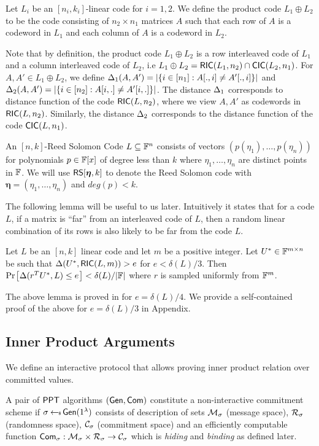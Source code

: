 \begin{definition}\label{defn:productcode}
Let $L_i$ be an $[n_i,k_i]$-linear code for $i=1,2$. We define the product code
$L_1\oplus L_2$ to be the code consisting of $n_2\times n_1$ matrices $A$ such
that each row of $A$ is a codeword in $L_1$ and each column of $A$ is a
codeword in $L_2$. 
\end{definition}

Note that by definition, the product code $L_1\oplus L_2$ is a row interleaved
code of $L_1$ and a column interleaved code of $L_2$, i.e $L_1\oplus L_2 =
\mathsf{RIC}(L_1,n_2)\cap \mathsf{CIC}(L_2,n_1)$. For $A,A'\in L_1\oplus L_2$, we define
$\Delta_1(A,A')=|\{i\in [n_1]: A[.,i]\neq A'[.,i]\}|$ and $\Delta_2(A,A')=|\{i\in
[n_2]: A[i,.]\neq A'[i,.]\}|$. The distance $\Delta_1$ corresponds to distance
function of the code $\mathsf{RIC}(L,n_2)$, where we view $A,A'$ as codewords in
$\mathsf{RIC}(L,n_2)$. Similarly, the distance $\Delta_2$ corresponds to the distance
function of the code $\mathsf{CIC}(L,n_1)$.

\begin{definition}\label{defn:rscode}
An $[n,k]$-Reed Solomon Code $L\subseteq \mathbb{F}^n$ consists of vectors
$(p(\eta_1),\ldots,p(\eta_n))$ for polynomials $p\in \mathbb{F}[x]$ of degree less
than $k$ where $\eta_1,\ldots,\eta_n$ are distinct points in $\mathbb{F}$. We will use
$\mathsf{RS}[\bm{\eta},k]$ to denote the Reed Solomon code with
$\bm{\eta}=(\eta_1,\ldots,\eta_n)$ and $deg(p)<k$.
\end{definition}
   
The following lemma will be useful to us later. Intuitively it states that for
a code $L$, if a
matrix is ``far'' from an interleaved code of $L$, then a random linear combination of its
rows is also likely to be far from the code $L$. 

\begin{lemma}\label{lem:proximitytest}
Let $L$ be an $[n,k]$ linear code and let $m$ be a positive integer. Let
$U^\ast\in \mathbb{F}^{m\times n}$ be such that $\Delta(U^\ast,\mathsf{RIC}(L,m))>e$ for
$e<\delta(L)/3$. Then $\prob{\dham(r^TU^\ast,L)\leq e}<\delta(L)/|\FF|$ where
$r$ is sampled uniformly from $\mathbb{F}^m$. 
\end{lemma}
The above lemma is proved in \cite{Ligero2017} for $e=\delta(L)/4$. We provide
a self-contained proof of the above for $e=\delta(L)/3$ in Appendix.


\subsection{Inner Product Arguments}
We define an interactive protocol that allows proving inner product relation
over committed values. 
\begin{definition}\label{defn:commscheme}
 A pair of $\mathsf{PPT}$ algorithms
$(\mathsf{Gen},\mathsf{Com})$ constitute a non-interactive commitment scheme if
$\sigma\hskip2.3pt{\gets\!\!\mbox{\tiny${\$}$\normalsize}}\, \mathsf{Gen}(1^{\lambda})$ consists of description of sets
$\mathcal{M}_\sigma$ (message space), $\mathcal{R}_\sigma$ (randomness space),
$\mathcal{C}_\sigma$ (commitment space) and an efficiently computable function 
$\mathsf{Com}_\sigma: \mathcal{M}_\sigma\times \mathcal{R}_\sigma\rightarrow \mathcal{C}_\sigma$ which is {\em hiding} and {\em binding} as defined later.
\end{definition}

